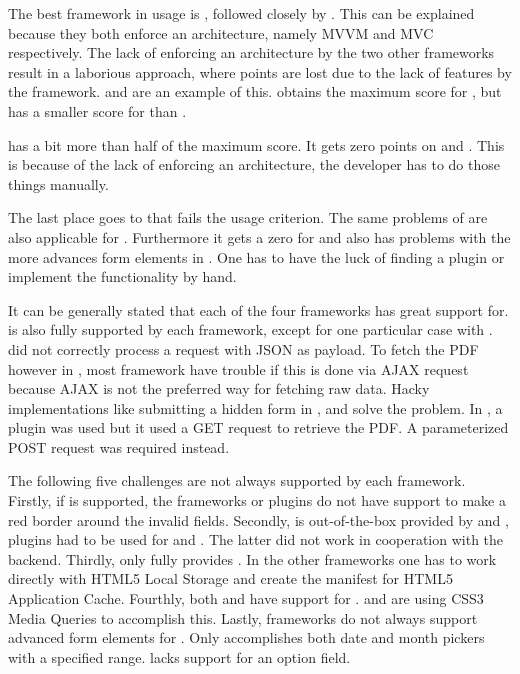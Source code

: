 \documentclass[a4paper]{artikel3}
\begin{document}
The best framework in usage is \kendoa{}, followed closely by \sta{}.
This can be explained because they both enforce an architecture, namely MVVM and MVC respectively.
The lack of enforcing an architecture by the two other frameworks result in a laborious approach, where points are lost due to the lack of features by the framework.
 and  are an example of this.
\kendoa{} obtains the maximum score for , but has a smaller score for  than \sta.

\jqma{} has a bit more than half of the maximum score.
It gets zero points on  and .
This is because of the lack of enforcing an architecture, the developer has to do those things manually. 

The last place goes to \lungo{} that fails the usage criterion.
The same problems of \jqma{} are also applicable for \lungo{}.
Furthermore it gets a zero for  and also has problems with the more advances form elements in .
One has to have the luck of finding a plugin or implement the functionality by hand.

It can be generally stated that each of the four frameworks has great support for.
 is also fully supported by each framework, except for one particular case with \lungo{}.
\quo{} did not correctly process a request with JSON as payload.
To fetch the PDF however in , most framework have trouble if this is done via AJAX request because AJAX is not the preferred way for fetching raw data.
Hacky implementations like submitting a hidden form in \jqma{}, \kendoa{} and \lungo{} solve the problem.
In \sta{}, a plugin was used but it used a GET request to retrieve the PDF.
A parameterized POST request was required instead.

The following five challenges are not always supported by each framework.
Firstly, if  is supported, the frameworks or plugins do not have support to make a red border around the invalid fields.
Secondly,  is out-of-the-box provided by \kendoa{} and \jqma{}, plugins had to be used for \lungo{} and \sta{}.
The latter did not work in cooperation with the backend.
Thirdly, only \sta{} fully provides .
In the other frameworks one has to work directly with HTML5 Local Storage and create the manifest for HTML5 Application Cache.
Fourthly, both \sta{} and \kendoa{} have support for .
\jqma{} and \lungo{} are using CSS3 Media Queries to accomplish this.
Lastly, frameworks do not always support advanced form elements for .
Only \kendoa{} accomplishes both date and month pickers with a specified range.  
\lungo{} lacks support for an option field.
\end{document}
